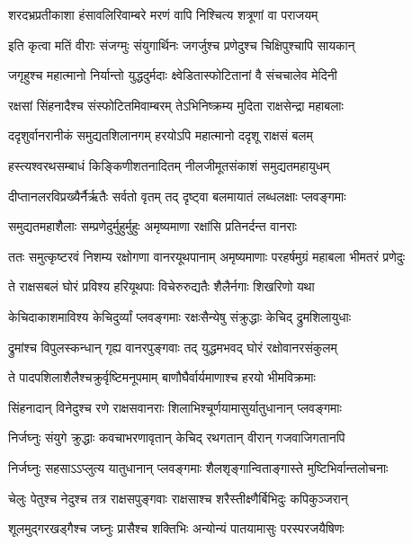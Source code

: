\twolineshloka
{शरदभ्रप्रतीकाशा हंसावलिरिवाम्बरे}
{मरणं वापि निश्चित्य शत्रूणां वा पराजयम्} %

\twolineshloka
{इति कृत्वा मतिं वीराः संजग्मुः संयुगार्थिनः}
{जगर्जुश्च प्रणेदुश्च चिक्षिपुश्चापि सायकान्} %

\twolineshloka
{जगृहुश्च महात्मानो निर्यान्तो युद्धदुर्मदाः}
{क्ष्वेडितास्फोटितानां वै संचचालेव मेदिनी} %

\twolineshloka
{रक्षसां सिंहनादैश्च संस्फोटितमिवाम्बरम्}
{तेऽभिनिष्क्रम्य मुदिता राक्षसेन्द्रा महाबलाः} %

\twolineshloka
{ददृशुर्वानरानीकं समुद्यतशिलानगम्}
{हरयोऽपि महात्मानो ददृशू राक्षसं बलम्} %

\twolineshloka
{हस्त्यश्वरथसम्बाधं किङ्किणीशतनादितम्}
{नीलजीमूतसंकाशं समुद्यतमहायुधम्} %

\twolineshloka
{दीप्तानलरविप्रख्यैर्नैर्ऋतैः सर्वतो वृतम्}
{तद् दृष्ट्वा बलमायातं लब्धलक्षाः प्लवङ्गमाः} %

\twolineshloka
{समुद्यतमहाशैलाः सम्प्रणेदुर्मुहुर्मुहुः}
{अमृष्यमाणा रक्षांसि प्रतिनर्दन्त वानराः} %

\twolineshloka
{ततः समुत्कृष्टरवं निशम्य रक्षोगणा वानरयूथपानाम्}
{अमृष्यमाणाः परहर्षमुग्रं महाबला भीमतरं प्रणेदुः} %

\twolineshloka
{ते राक्षसबलं घोरं प्रविश्य हरियूथपाः}
{विचेरुरुद्यतैः शैलैर्नगाः शिखरिणो यथा} %

\twolineshloka
{केचिदाकाशमाविश्य केचिदुर्व्यां प्लवङ्गमाः}
{रक्षःसैन्येषु संक्रुद्धाः केचिद् द्रुमशिलायुधाः} %

\twolineshloka
{द्रुमांश्च विपुलस्कन्धान् गृह्य वानरपुङ्गवाः}
{तद् युद्धमभवद् घोरं रक्षोवानरसंकुलम्} %

\twolineshloka
{ते पादपशिलाशैलैश्चक्रुर्वृष्टिमनूपमाम्}
{बाणौघैर्वार्यमाणाश्च हरयो भीमविक्रमाः} %

\twolineshloka
{सिंहनादान् विनेदुश्च रणे राक्षसवानराः}
{शिलाभिश्चूर्णयामासुर्यातुधानान् प्लवङ्गमाः} %

\twolineshloka
{निर्जघ्नुः संयुगे क्रुद्धाः कवचाभरणावृतान्}
{केचिद् रथगतान् वीरान् गजवाजिगतानपि} %

\twolineshloka
{निर्जघ्नुः सहसाऽऽप्लुत्य यातुधानान् प्लवङ्गमाः}
{शैलशृङ्गान्विताङ्गास्ते मुष्टिभिर्वान्तलोचनाः} %

\twolineshloka
{चेलुः पेतुश्च नेदुश्च तत्र राक्षसपुङ्गवाः}
{राक्षसाश्च शरैस्तीक्ष्णैर्बिभिदुः कपिकुञ्जरान्} %

\twolineshloka
{शूलमुद्गरखड्गैश्च जघ्नुः प्रासैश्च शक्तिभिः}
{अन्योन्यं पातयामासुः परस्परजयैषिणः} %

